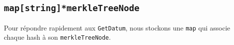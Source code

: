 \subsection{\texttt{map[string]*merkleTreeNode}}
Pour répondre rapidement aux \texttt{GetDatum}, nous stockons une \texttt{map} qui associe chaque hash à son \texttt{merkleTreeNode}.

